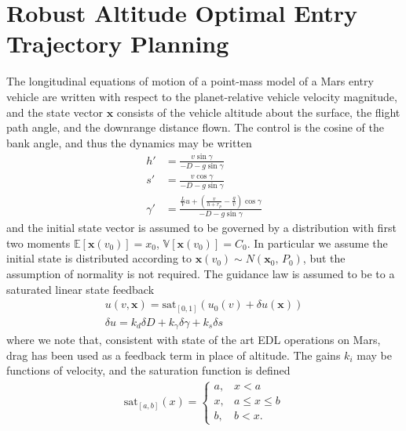 \documentclass[letterpaper, paper,11pt]{AAS}
\newcommand{\state}{\ensuremath{\mathbf{x}}}
\newcommand{\E}[1]{\mathbb{E}\left[#1\right]}
\newcommand{\V}[1]{\mathbb{V}[#1]}
\newcommand{\cov}{C}
\begin{document}
\section{Robust Altitude Optimal Entry Trajectory Planning}
The longitudinal equations of motion of a point-mass model of a Mars entry vehicle are written with respect to the planet-relative vehicle velocity magnitude, and the state vector $\state$ consists of the vehicle altitude about the surface, the flight path angle, and the downrange distance flown. The control is the cosine of the bank angle, and thus the dynamics may be written
\begin{align}
h' &= \frac{v\sin\gamma}{-D - g\sin\gamma} \\
s' &= \frac{v\cos\gamma}{-D - g\sin\gamma} \\
\gamma' &= \frac{\frac{L}{V}u + \left(\frac{v}{h+r_p}-\frac{g}{v}\right)\cos\gamma}{-D - g\sin\gamma}
\end{align}
and the initial state vector is assumed to be governed by a distribution with first two moments $\E{\state(v_0)} = x_0$, $\V{\state(v_0)} = \cov_0$. In particular we assume the initial state is distributed according to $\state(v_0)\sim N(\state_0,\,P_0)$, but the assumption of normality is not required.
The guidance law is assumed to be to a saturated linear state feedback 
\begin{align}
u(v,\state) = \mathrm{sat}_{[0,1]}\left(u_0(v) + \delta u(\state)\right)\\
\delta u = k_d\delta D + k_{\gamma}\delta\gamma + k_s\delta s
\end{align}
where we note that, consistent with state of the art EDL operations on Mars, drag has been used as a feedback term in place of altitude. The gains $k_i$ may be functions of velocity, and the saturation function is defined
\begin{align*}
\mathrm{sat}_{[a,b]}(x) = \left\{\begin{array}{lc}
        a, &  x < a\\
        x, &  a\le x \le b\\
        b, &  b < x.
        \end{array} \right. %
\end{align*}
\end{document}
